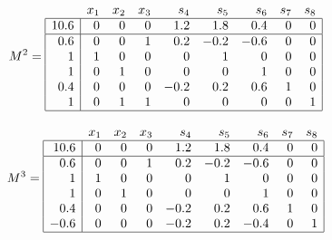 {\newpage\clearpage
{}%
\begin{displaymath}
         M^2 =
         \begin{array}{|r|rrrrrrrr|}
            \multicolumn{1}{c}{\quad} & x_1 & x_2 & x_3 & s_4 & s_5 & s_6 &
                s_7 & \multicolumn{1}{c}{s_8} \\\hline
             10.6 & 0 & 0 & 0 & 1.2 & 1.8 & 0.4 & 0 & 0 \\\hline
             0.6 & 0 & 0 & 1 & 0.2 & -0.2 & -0.6 & 0 & 0 \\
             1 & 1 & 0 & 0 & 0 & 1 & 0 & 0 & 0 \\
             1 & 0 & 1 & 0 & 0 & 0 & 1 & 0 & 0 \\
             0.4 & 0 & 0 & 0 & -0.2 & 0.2 & 0.6 & 1 & 0 \\
             1 & 0 & 1 & 1 & 0 & 0 & 0 & 0 & 1 \\\hline
         \end{array}
       \end{displaymath}%
\lthtmldisplayZ
\hfill\lthtmlcheckvsize\clearpage}

{\newpage\clearpage
{}%
\begin{displaymath}
         M^3 =
         \begin{array}{|r|rrrrrrrr|}
            \multicolumn{1}{c}{\quad} & x_1 & x_2 & x_3 & s_4 & s_5 & s_6 &
                s_7 & \multicolumn{1}{c}{s_8} \\\hline
             10.6 & 0 & 0 & 0 & 1.2 & 1.8 & 0.4 & 0 & 0 \\\hline
             0.6 & 0 & 0 & 1 & 0.2 & -0.2 & -0.6 & 0 & 0 \\
             1 & 1 & 0 & 0 & 0 & 1 & 0 & 0 & 0 \\
             1 & 0 & 1 & 0 & 0 & 0 & 1 & 0 & 0 \\
             0.4 & 0 & 0 & 0 & -0.2 & 0.2 & 0.6 & 1 & 0 \\
             -0.6 & 0 & 0 & 0 & -0.2 & 0.2 & -0.4 & 0 & 1 \\\hline
         \end{array}
       \end{displaymath}%
\lthtmldisplayZ
\hfill\lthtmlcheckvsize\clearpage}


